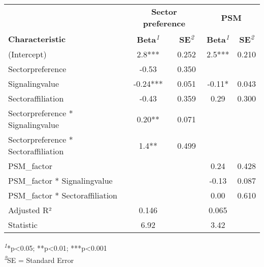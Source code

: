 \setlength{\LTpost}{0mm}
\begin{longtable}{lcccc}
\toprule
 & \multicolumn{2}{c}{\textbf{Sector preference}} & \multicolumn{2}{c}{\textbf{PSM}} \\ 
\cmidrule(lr){2-3} \cmidrule(lr){4-5}
\textbf{Characteristic} & \textbf{Beta}\textsuperscript{\textit{1}} & \textbf{SE}\textsuperscript{\textit{2}} & \textbf{Beta}\textsuperscript{\textit{1}} & \textbf{SE}\textsuperscript{\textit{2}} \\ 
\midrule\addlinespace[2.5pt]
(Intercept) & 2.8*** & 0.252 & 2.5*** & 0.210 \\ 
Sectorpreference & -0.53 & 0.350 &  &  \\ 
Signalingvalue & -0.24*** & 0.051 & -0.11* & 0.043 \\ 
Sectoraffiliation & -0.43 & 0.359 & 0.29 & 0.300 \\ 
Sectorpreference * Signalingvalue & 0.20** & 0.071 &  &  \\ 
Sectorpreference * Sectoraffiliation & 1.4** & 0.499 &  &  \\ 
PSM\_factor &  &  & 0.24 & 0.428 \\ 
PSM\_factor * Signalingvalue &  &  & -0.13 & 0.087 \\ 
PSM\_factor * Sectoraffiliation &  &  & 0.00 & 0.610 \\ 
Adjusted R² & 0.146 &  & 0.065 &  \\ 
Statistic & 6.92 &  & 3.42 &  \\ 
\bottomrule
\end{longtable}
\begin{minipage}{\linewidth}
\textsuperscript{\textit{1}}*p\textless{}0.05; **p\textless{}0.01; ***p\textless{}0.001\\
\textsuperscript{\textit{2}}SE = Standard Error\\
\end{minipage}

